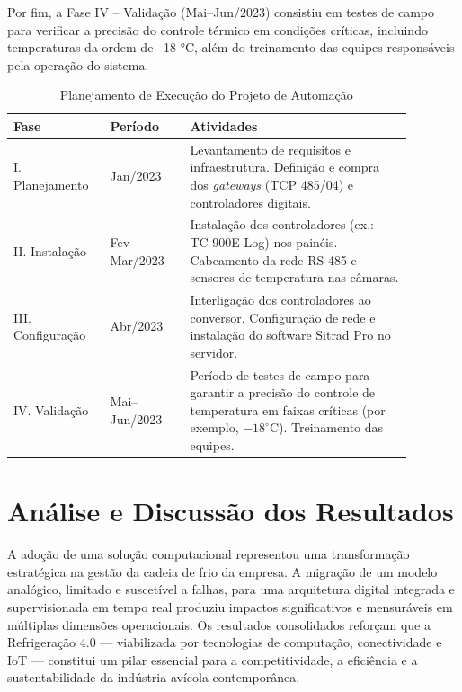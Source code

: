 \documentclass[12pt]{article}
\begin{document}
Por fim, a Fase IV – Validação (Mai–Jun/2023) consistiu em testes de campo para verificar a precisão do controle térmico em condições críticas, incluindo temperaturas da ordem de –18 °C, além do treinamento das equipes responsáveis pela operação do sistema.

\begin{table}[h]
    \centering
    \caption{Planejamento de Execução do Projeto de Automação}
    \label{tab:planejamento}
    \begin{tabular}{p{0.2\linewidth} p{0.18\linewidth} p{0.5\linewidth}}
        \toprule
        \textbf{Fase} & \textbf{Período} & \textbf{Atividades} \\
        \midrule
        I. Planejamento & Jan/2023 & Levantamento de requisitos e infraestrutura. Definição e compra dos \textit{gateways} (TCP 485/04) e controladores digitais. \\
        II. Instalação & Fev--Mar/2023 & Instalação dos controladores (ex.: TC-900E Log) nos painéis. Cabeamento da rede RS-485 e sensores de temperatura nas câmaras. \\
        III. Configuração & Abr/2023 & Interligação dos controladores ao conversor. Configuração de rede e instalação do software Sitrad Pro no servidor. \\
        IV. Validação & Mai--Jun/2023 & Período de testes de campo para garantir a precisão do controle de temperatura em faixas críticas (por exemplo, $-18^\circ\text{C}$). Treinamento das equipes. \\
        \bottomrule
    \end{tabular}
\end{table}


\section{Análise e Discussão dos Resultados} \label{sec:resultados}

A adoção de uma solução computacional representou uma transformação estratégica na gestão da cadeia de frio da empresa. A migração de um modelo analógico, limitado e suscetível a falhas, para uma arquitetura digital integrada e supervisionada em tempo real produziu impactos significativos e mensuráveis em múltiplas dimensões operacionais. Os resultados consolidados reforçam que a Refrigeração 4.0 — viabilizada por tecnologias de computação, conectividade e IoT — constitui um pilar essencial para a competitividade, a eficiência e a sustentabilidade da indústria avícola contemporânea.
\end{document}
